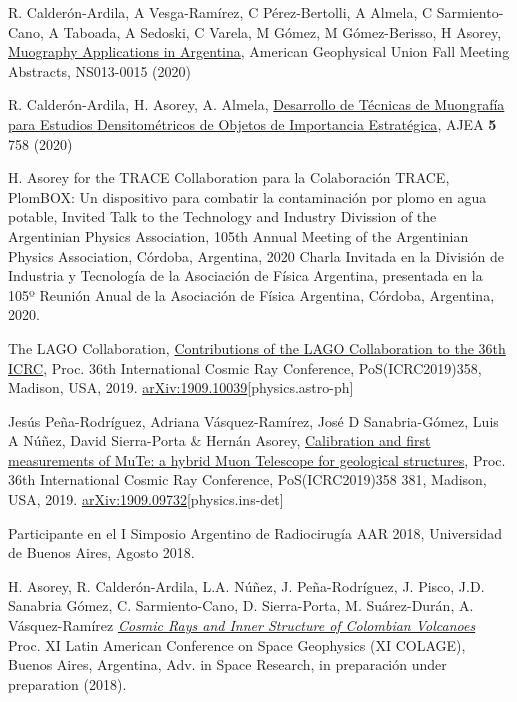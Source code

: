 \begin{etaremune}
\item {} R. Calderón-Ardila, A Vesga-Ramírez, C Pérez-Bertolli, A Almela, C Sarmiento-Cano, A Taboada, A Sedoski, C Varela, M Gómez, M Gómez-Berisso, H Asorey, \href{https://ui.adsabs.harvard.edu/abs/2020AGUFMNS0130015C/abstract}{Muography Applications in Argentina}, American Geophysical Union Fall Meeting Abstracts, NS013-0015 (2020)

\item {} R. Calderón-Ardila, H. Asorey, A. Almela, \href{https://doi.org/10.33414/ajea.5.758.2020}{Desarrollo de Técnicas de Muongrafía para Estudios Densitométricos de Objetos de Importancia Estratégica}, AJEA {\bf{5}} 758 (2020)

\item {} H. Asorey \ifeng for the TRACE Collaboration \else para la Colaboración TRACE\fi, PlomBOX: Un dispositivo para combatir la contaminación por plomo en agua potable, \ifeng Invited Talk to the Technology and Industry Divission of the Argentinian Physics Association, 105th Annual Meeting of the Argentinian Physics Association, Córdoba, Argentina, 2020 \else Charla Invitada en la División de Industria y Tecnología de la Asociación de Física Argentina, presentada en la 105º Reunión Anual de la Asociación de Física Argentina, Córdoba, Argentina, 2020.\fi

\item {} The LAGO Collaboration, \href{https://arxiv.org/abs/1909.10039}{Contributions of the LAGO Collaboration to the 36th ICRC}, \en Proc. 36th International Cosmic Ray Conference, PoS(ICRC2019)358, Madison, USA, 2019. \href{http://arxiv.org/abs/1909.10039}{arXiv:1909.10039}[physics.astro-ph]

\item {} Jesús Peña-Rodríguez, Adriana Vásquez-Ramírez, José D Sanabria-Gómez, Luis A Núñez, David Sierra-Porta \& Hernán Asorey, \href{https://pos.sissa.it/358/381/}{Calibration and first measurements of MuTe: a hybrid Muon Telescope for geological structures}, \en Proc. 36th International Cosmic Ray Conference, PoS(ICRC2019)358 381, Madison, USA, 2019. \href{http://arxiv.org/abs/1909.09732}{arXiv:1909.09732}[physics.ins-det]

\item {} Participante en el I Simposio Argentino de Radiocirugía AAR 2018, Universidad de Buenos Aires, Agosto 2018. 

\item {} H. Asorey, R. Calderón-Ardila, L.A. Núñez, J. Peña-Rodríguez, J. Pisco, J.D. Sanabria Gómez, C. Sarmiento-Cano, D. Sierra-Porta, M. Suárez-Durán, A. Vásquez-Ramírez \href{}{\emph{Cosmic Rays and Inner Structure of Colombian Volcanoes}} \en Proc. XI Latin American Conference on Space Geophysics (XI COLAGE), Buenos Aires, Argentina, Adv. in Space Research, \ifeng in preparación \else under preparation \fi (2018). %


\end{etaremune}
